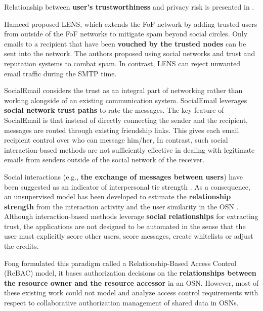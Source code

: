 Relationship between \textbf{user’s trustworthiness} and privacy risk is presented in \cite{pandey_computing_2015}.

Hameed \cite{hameed_lens_2011} proposed LENS,
	which extends the FoF network by adding trusted users from outside of the FoF networks to mitigate spam beyond social circles.
Only emails to a recipient that have been \textbf{vouched by the trusted nodes} can be sent into the network.
The authors proposed using social networks and trust and reputation systems to combat spam.
In contrast,
	LENS can reject unwanted email traffic during the SMTP time.

SocialEmail \cite{tran_social_2010} considers the trust as an integral part of networking rather than working alongside of an existing communication system.
SocialEmail leverages \textbf{social network trust paths} to rate the messages.
The key feature of SocialEmail is that instead of directly connecting the sender and the recipient,
	messages are routed through existing friendship links.
This gives each email recipient control over who can message him/her,
In contrast,
	such social interaction-based methods are not sufficiently effective in dealing with legitimate emails from senders outside of the social network of the receiver.

Social interactions (e.g.,
	\textbf{the exchange of messages between users}) have been suggested as an indicator of interpersonal tie strength \cite{xiang_modeling_2010}.
As a consequence,
	an unsupervised model has been developed to estimate the \textbf{relationship strength} from the interaction activity and the user similarity in the OSN \cite{xiang_modeling_2010}.
Although interaction-based methods leverage \textbf{social relationships} for extracting trust,
	the applications are not designed to be automated in the sense that the user must explicitly score other users,
	score messages,
	create whitelists or adjust the credits.

Fong \cite{fong_relationshipbased_2011} formulated this paradigm called a Relationship-Based Access Control (ReBAC) model,
	it bases authorization decisions on the \textbf{relationships between the resource owner and the resource accessor} in an OSN.
However,
	most of these existing work could not model and analyze access control requirements with respect to collaborative authorization management of shared data in OSNs.


